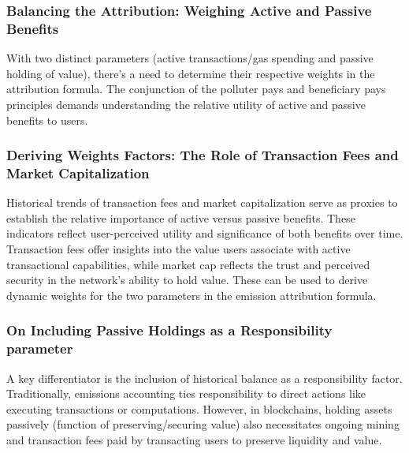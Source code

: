 \documentclass[11pt]{report}
\begin{document}
\subsubsection*{Balancing the Attribution: Weighing Active and Passive Benefits}
With two distinct parameters (active transactions/gas spending and passive holding of value), there's a need to determine their respective weights in the attribution formula. The conjunction of the polluter pays and beneficiary pays principles demands understanding the relative utility of active and passive benefits to users.

\subsubsection*{Deriving Weights Factors: The Role of Transaction Fees and Market Capitalization}
Historical trends of transaction fees and market capitalization serve as proxies to establish the relative importance of active versus passive benefits. These indicators reflect user-perceived utility and significance of both benefits over time. Transaction fees offer insights into the value users associate with active transactional capabilities, while market cap reflects the trust and perceived security in the network's ability to hold value. These can be used to derive dynamic weights for the two parameters in the emission attribution formula.



\subsubsection*{On Including Passive Holdings as a Responsibility parameter}
A key differentiator is the inclusion of historical balance as a responsibility factor. Traditionally, emissions accounting ties responsibility to direct actions like executing transactions or computations.  However, in blockchains, holding assets passively (function of preserving/securing value) also necessitates ongoing mining and transaction fees paid by transacting users to preserve liquidity and value.

\end{document}
